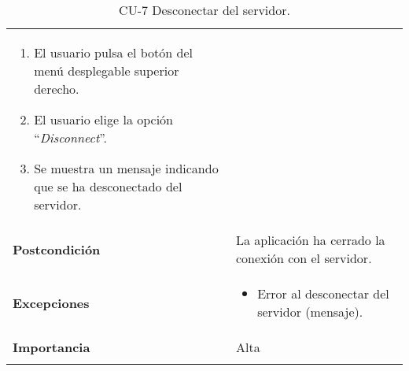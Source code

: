 \begin{longtable}[h!]{@{}ll@{}}
\begin{minipage}[t]{0.71\columnwidth}
\begin{enumerate}
\def\labelenumi{\arabic{enumi}.}
\tightlist
\item
  El usuario pulsa el botón del menú desplegable superior derecho.
\item
  El usuario elige la opción ``\textit{Disconnect}''.
\item
  Se muestra un mensaje indicando que se ha desconectado del servidor.
\end{enumerate}\strut
\end{minipage}\tabularnewline
\begin{minipage}[t]{0.23\columnwidth}\raggedright\strut
\textbf{Postcondición}\strut
\end{minipage} & \begin{minipage}[t]{0.71\columnwidth}\raggedright\strut
La aplicación ha cerrado la conexión con el servidor.\strut
\end{minipage}\tabularnewline
\begin{minipage}[t]{0.23\columnwidth}\raggedright\strut
\textbf{Excepciones}\strut
\end{minipage} & \begin{minipage}[t]{0.71\columnwidth}\raggedright\strut
\begin{itemize}
\tightlist
\item
  Error al desconectar del servidor (mensaje).
\end{itemize}\strut
\end{minipage}\tabularnewline
\begin{minipage}[t]{0.23\columnwidth}\raggedright\strut
\textbf{Importancia}\strut
\end{minipage} & \begin{minipage}[t]{0.71\columnwidth}\raggedright\strut
Alta\strut
\end{minipage}\tabularnewline
\bottomrule
\caption{CU-7 Desconectar del servidor.}
\end{longtable}


